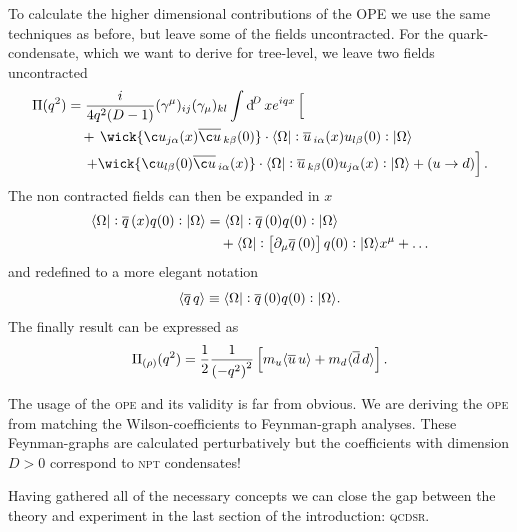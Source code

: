 \documentclass[../../index.tex]{subfiles}
\begin{document}
To calculate the higher dimensional contributions of the OPE we use the same
techniques as before, but leave some of the fields uncontracted. For the
quark-condensate, which we want to derive for tree-level, we leave two fields
uncontracted
\begin{equation}
  \begin{split}
    \Pi(q^2) &= \frac{i}{4q^2(D-1)} (\gamma^\mu)_{ij} (\gamma_\mu)_{kl} \int \dif^D x e^{iqx} \left[ \phantom{\wick{ \c u_{j \alpha}(x) \anti{\c u}_{k \beta}(0)}} \right.\\
    &\quad+\,\wick{ \c u_{j \alpha}(x) \anti{\c u}_{k \beta}(0)} \cdot \langle \Omega \vert : \anti{u}_{i \alpha}(x) u_{l \beta} (0) :\vert \Omega \rangle \\
    &\quad\,\left.+\wick{\c u_{l \beta}(0) \anti{\c u}_{i \alpha}(x)} \cdot
      \langle \Omega \vert: \anti{u}_{k \beta}(0) u_{j \alpha}(x) : \vert \Omega
      \rangle + (u \to d) \right].
  \end{split}
\end{equation}
The non contracted fields can then be expanded in $x$
\begin{equation}
  \begin{split}
    \langle \Omega \vert: \overline{q}\,(x) q(0):\vert \Omega \rangle &= \langle\Omega\vert: \overline{q}\,(0) q(0): \vert\Omega\rangle\\
    &\quad+ \langle\Omega\vert:\left[ \partial_\mu \overline{q}\,(0) \right]
    q(0):\vert\Omega\rangle x^\mu + \dots
  \end{split}
\end{equation}
and redefined to a more elegant notation
\begin{equation}
  \langle \overline{q}\,q \rangle \equiv \langle\Omega\vert: \overline{q}\,(0) q(0):\vert\Omega\rangle.
\end{equation}
The finally result can be expressed as 
\begin{equation}
  \Pi_{(\rho)}(q^2) = \frac{1}{2} \frac{1}{\left(-q^2\right)^2} \left[ m_u\langle \overline{u}\, u \rangle + m_d \langle \overline{d}\, d \rangle\right].
\end{equation}

The usage of the \textsc{ope} and its validity is far from obvious. We are deriving the
\textsc{ope} from matching the Wilson-coefficients to Feynman-graph analyses. These
Feynman-graphs are calculated perturbatively but the coefficients with dimension
$D>0$ correspond to \textsc{npt} condensates!

Having gathered all of the necessary concepts we can close the gap between the
theory and experiment in the last section of the introduction: \textsc{qcdsr}.
\end{document}
